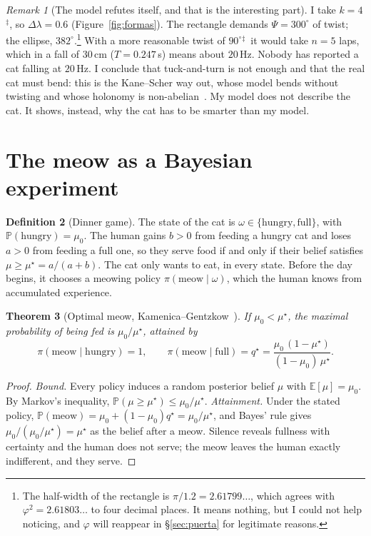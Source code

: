 \documentclass[11pt,a4paper]{article}
\theoremstyle{plain}
\newtheorem{teorema}{Theorem}[section]
\theoremstyle{definition}
\newtheorem{definicion}[teorema]{Definition}
\theoremstyle{remark}
\newtheorem{observacion}[teorema]{Remark}
\numberwithin{equation}{section}
\newcommand{\E}{\mathbb{E}}
\renewcommand{\P}{\mathbb{P}}
\newcommand{\calib}{{\ensuremath{^{\ddagger}}}}
\begin{document}
\begin{observacion}[The model refutes itself, and that is the interesting part]
I take $k=4$\calib, so $\Delta\lambda=0.6$ (Figure~\ref{fig:formas}). The rectangle demands $\Psi=300^\circ$ of twist; the ellipse, $382^\circ$.\footnote{The half-width of the rectangle is $\pi/1.2=2.61799\ldots$, which agrees with $\varphi^2=2.61803\ldots$ to four decimal places. It means nothing, but I could not help noticing, and $\varphi$ will reappear in \S\ref{sec:puerta} for legitimate reasons.} With a more reasonable twist of $90^\circ$\calib\ it would take $n=5$ laps, which in a fall of $30$\,cm ($T=0.247$\,s) means about $20$\,Hz. Nobody has reported a cat falling at $20$\,Hz. I conclude that tuck-and-turn is not enough and that the real cat must bend: this is the Kane--Scher way out, whose model bends without twisting and whose holonomy is non-abelian~\cite{kanescher,montgomery}. My model does not describe the cat. It shows, instead, why the cat has to be smarter than my model.
\end{observacion}

\section{The meow as a Bayesian experiment}\label{sec:maullido}

\begin{definicion}[Dinner game]
The state of the cat is $\omega\in\{\text{hungry},\text{full}\}$, with $\P(\text{hungry})=\mu_0$. The human gains $b>0$ from feeding a hungry cat and loses $a>0$ from feeding a full one, so they serve food if and only if their belief satisfies $\mu\ge\mu^\star=a/(a+b)$. The cat only wants to eat, in every state. Before the day begins, it chooses a meowing policy $\pi(\text{meow}\mid\omega)$, which the human knows from accumulated experience.
\end{definicion}

\begin{teorema}[Optimal meow, Kamenica--Gentzkow~\cite{kamenica}]\label{teo:maullido}
If $\mu_0<\mu^\star$, the maximal probability of being fed is $\mu_0/\mu^\star$, attained by
\begin{equation}
  \pi(\text{meow}\mid\text{hungry})=1,
  \qquad
  \pi(\text{meow}\mid\text{full})=q^\star=\frac{\mu_0\,(1-\mu^\star)}{(1-\mu_0)\,\mu^\star}.
\end{equation}
\end{teorema}

\begin{proof}
\emph{Bound.} Every policy induces a random posterior belief $\mu$ with $\E[\mu]=\mu_0$. By Markov's inequality, $\P(\mu\ge\mu^\star)\le\mu_0/\mu^\star$. \emph{Attainment.} Under the stated policy, $\P(\text{meow})=\mu_0+(1-\mu_0)q^\star=\mu_0/\mu^\star$, and Bayes' rule gives $\mu_0/(\mu_0/\mu^\star)=\mu^\star$ as the belief after a meow. Silence reveals fullness with certainty and the human does not serve; the meow leaves the human exactly indifferent, and they serve.
\end{proof}
\end{document}
